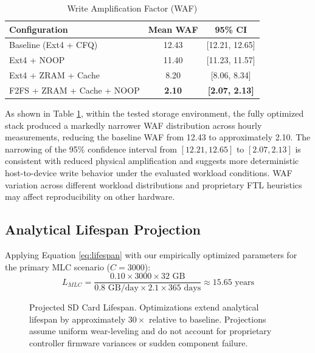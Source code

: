 \documentclass[conference]{IEEEtran}
\begin{document}
\begin{table}[htbp]
\caption{Write Amplification Factor (WAF)}
\begin{center}
\begin{tabular}{@{}lcc@{}}
\toprule
\textbf{Configuration} & \textbf{Mean WAF} & \textbf{95\% CI} \\
\midrule
Baseline (Ext4 + CFQ) & 12.43 & [12.21, 12.65] \\
Ext4 + NOOP & 11.40 & [11.23, 11.57] \\
Ext4 + ZRAM + Cache & 8.20 & [8.06, 8.34] \\
F2FS + ZRAM + Cache + NOOP & \textbf{2.10} & \textbf{[2.07, 2.13]} \\
\bottomrule
\end{tabular}
\end{center}
\label{tab:waf}
\end{table}

As shown in Table \ref{tab:waf}, within the tested storage environment, the fully optimized stack produced a markedly narrower WAF distribution across hourly measurements, reducing the baseline WAF from 12.43 to approximately 2.10. The narrowing of the 95\% confidence interval from $[12.21, 12.65]$ to $[2.07, 2.13]$ is consistent with reduced physical amplification and suggests more deterministic host-to-device write behavior under the evaluated workload conditions. WAF variation across different workload distributions and proprietary FTL heuristics may affect reproducibility on other hardware.

\subsection{Analytical Lifespan Projection}
Applying Equation \ref{eq:lifespan} with our empirically optimized parameters for the primary MLC scenario ($C = 3000$):
\begin{equation}
L_{MLC} = \frac{0.10 \times 3000 \times 32 \text{ GB}}{0.8 \text{ GB/day} \times 2.1 \times 365 \text{ days}} \approx 15.65 \text{ years}
\end{equation}

\begin{figure}[t]
\centering
{}
\caption{Projected SD Card Lifespan. Optimizations extend analytical lifespan by approximately $30\times$ relative to baseline. Projections assume uniform wear-leveling and do not account for proprietary controller firmware variances or sudden component failure.}
\label{fig:lifespan_projection}
\end{figure}
\end{document}
